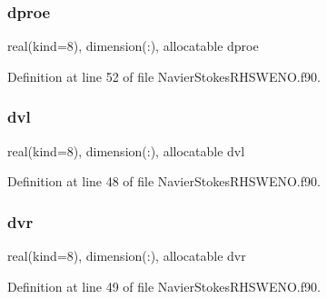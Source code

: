 \subsubsection{\texorpdfstring{dproe}{dproe}}
{\footnotesize\ttfamily real(kind=8), dimension(\+:), allocatable dproe}



Definition at line 52 of file Navier\+Stokes\+R\+H\+S\+W\+E\+N\+O.\+f90.

\hypertarget{structnavierstokesrhsweno_1_1dissipation__local_a5a45a3f309780c73848885e60e2397e4}{}\label{structnavierstokesrhsweno_1_1dissipation__local_a5a45a3f309780c73848885e60e2397e4} 
\subsubsection{\texorpdfstring{dvl}{dvl}}
{\footnotesize\ttfamily real(kind=8), dimension(\+:), allocatable dvl}



Definition at line 48 of file Navier\+Stokes\+R\+H\+S\+W\+E\+N\+O.\+f90.

\hypertarget{structnavierstokesrhsweno_1_1dissipation__local_a6647a7f6936f963962f32fbe43184f40}{}\label{structnavierstokesrhsweno_1_1dissipation__local_a6647a7f6936f963962f32fbe43184f40} 
\subsubsection{\texorpdfstring{dvr}{dvr}}
{\footnotesize\ttfamily real(kind=8), dimension(\+:), allocatable dvr}



Definition at line 49 of file Navier\+Stokes\+R\+H\+S\+W\+E\+N\+O.\+f90.

\hypertarget{structnavierstokesrhsweno_1_1dissipation__local_aea2e5de12e487d374577c020305b3d64}{}\label{structnavierstokesrhsweno_1_1dissipation__local_aea2e5de12e487d374577c020305b3d64} 
